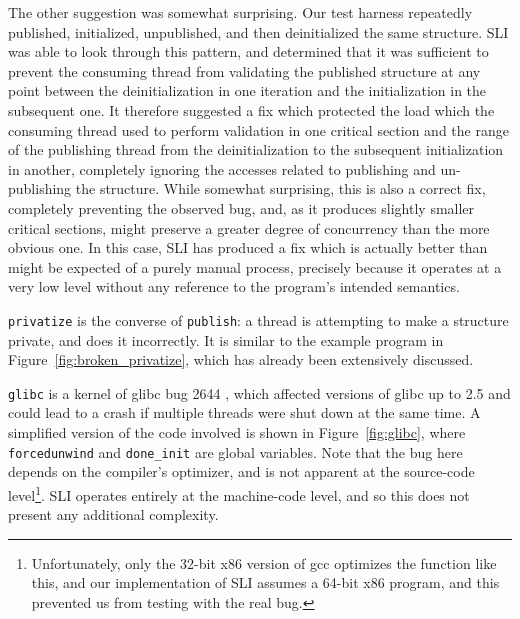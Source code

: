 \documentclass[10pt,letter,twocolumn]{sigplanconf}
\begin{document}
The other suggestion was somewhat surprising.  Our test harness
repeatedly published, initialized, unpublished, and then deinitialized
the same structure.  SLI was able to look through this pattern, and
determined that it was sufficient to prevent the consuming thread from
validating the published structure at any point between the
deinitialization in one iteration and the initialization in the
subsequent one.  It therefore suggested a fix which protected the load
which the consuming thread used to perform validation in one critical
section and the range of the publishing thread from the
deinitialization to the subsequent initialization in another,
completely ignoring the accesses related to publishing and
un-publishing the structure.  While somewhat surprising, this is also
a correct fix, completely preventing the observed bug, and, as it
produces slightly smaller critical sections, might preserve a greater
degree of concurrency than the more obvious one.  In this case, SLI
has produced a fix which is actually better than might be expected of
a purely manual process, precisely because it operates at a very low
level without any reference to the program's intended semantics.

\verb|privatize| is the converse of \verb|publish|: a thread is
attempting to make a structure private, and does it incorrectly.  It
is similar to the example program in Figure~\ref{fig:broken_privatize}, which has already been extensively
discussed.

\verb|glibc| is a kernel of glibc bug 2644 \cite{glibc2644}, which
affected versions of glibc up to 2.5 and could lead to a crash if
multiple threads were shut down at the same time.  A simplified
version of the code involved is shown in Figure~\ref{fig:glibc}, where
\verb|forcedunwind| and \verb|done_init| are global variables.  Note
that the bug here depends on the compiler's optimizer, and is not
apparent at the source-code level\footnote{Unfortunately, only the
  32-bit x86 version of gcc optimizes the function like this, and our
  implementation of SLI assumes a 64-bit x86 program, and this
  prevented us from testing with the real bug.}.  SLI operates
entirely at the machine-code level, and so this does not present any
additional complexity.
\end{document}
